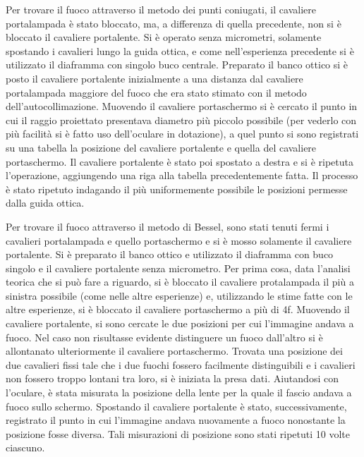 Per trovare il fuoco attraverso il metodo dei punti coniugati, il 
cavaliere portalampada \`e stato bloccato, ma, a differenza di 
quella precedente, non si è bloccato il cavaliere portalente. Si è 
operato senza micrometri, solamente spostando i cavalieri lungo la 
guida ottica, e come nell'esperienza precedente si è utilizzato il 
diaframma con singolo buco centrale. Preparato il banco ottico si è 
posto il cavaliere portalente inizialmente a una distanza dal 
cavaliere portalampada maggiore del fuoco che era stato stimato con 
il metodo dell'autocollimazione. Muovendo il cavaliere portaschermo 
si è cercato il punto in cui il raggio proiettato presentava 
diametro più piccolo possibile (per vederlo con più facilità si è 
fatto uso dell'oculare in dotazione), a quel punto si sono 
registrati su una tabella la posizione del cavaliere portalente e 
quella del cavaliere portaschermo. Il cavaliere portalente è stato 
poi spostato a destra e si è ripetuta l'operazione, aggiungendo una 
riga alla tabella precedentemente fatta. Il processo è stato 
ripetuto indagando il più uniformemente possibile le posizioni 
permesse dalla guida ottica.

Per trovare il fuoco attraverso il metodo di Bessel, sono stati 
tenuti fermi i cavalieri portalampada e quello portaschermo e si è 
mosso solamente il cavaliere portalente. Si è preparato il banco 
ottico e utilizzato il diaframma con buco singolo e il cavaliere 
portalente senza micrometro. Per prima cosa, data l'analisi teorica 
che si può fare a riguardo, si è bloccato il cavaliere protalampada 
il più a sinistra possibile (come nelle altre esperienze) e, 
utilizzando le stime fatte con le altre esperienze, si è bloccato il 
cavaliere portaschermo a più di 4f. Muovendo il cavaliere 
portalente, si sono cercate le due posizioni per cui l'immagine 
andava a fuoco. Nel caso non risultasse evidente distinguere un 
fuoco dall'altro si è allontanato ulteriormente il cavaliere 
portaschermo. Trovata una posizione dei due cavalieri fissi tale che 
i due fuochi fossero facilmente distinguibili e i cavalieri non 
fossero troppo lontani tra loro, si è iniziata la presa dati. 
Aiutandosi con l'oculare, è stata misurata la posizione della lente 
per la quale il fascio andava a fuoco sullo schermo. Spostando il 
cavaliere portalente è stato, successivamente, registrato il punto 
in cui l'immagine andava nuovamente a fuoco nonostante la posizione 
fosse diversa. Tali misurazioni di posizione sono stati ripetuti 10 
volte ciascuno.

